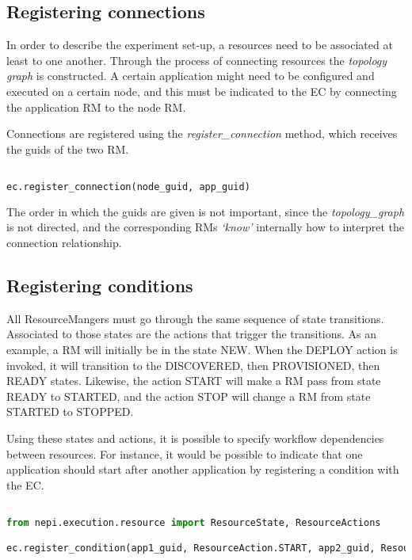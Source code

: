 \subsection{Registering connections}

In order to describe the experiment set-up, a resources need to be 
associated at least to one another. Through the process of connecting resources
the \emph{topology graph} is constructed. A certain application might
need to be configured and executed on a certain node, and this
must be indicated to the EC by connecting the application RM to the node
RM.

Connections are registered using the \emph{register\_connection} method,
which receives the guids of the two RM.

\begin{lstlisting}[language=Python]

ec.register_connection(node_guid, app_guid)

\end{lstlisting}

The order in which the guids are given is not important, since the
\emph{topology\_graph} is not directed, and the corresponding 
RMs \emph{`know'} internally how to interpret the connection 
relationship.


\subsection{Registering conditions}

All ResourceMangers must go through the same sequence of state transitions.
Associated to those states are the actions that trigger the transitions.
As an example, a RM will initially be in the state NEW. When the DEPLOY action
is invoked, it will transition to the DISCOVERED, then PROVISIONED, then READY
states. Likewise, the action START will make a RM pass from state READY to 
STARTED, and the action STOP will change a RM from state STARTED to STOPPED.

Using these states and actions, it is possible to specify workflow dependencies 
between resources. For instance, it would be possible to indicate that
one application should start after another application by registering a 
condition with the EC.

\begin{lstlisting}[language=Python]

from nepi.execution.resource import ResourceState, ResourceActions

ec.register_condition(app1_guid, ResourceAction.START, app2_guid, ResourceState.STARTED)

\end{lstlisting}


